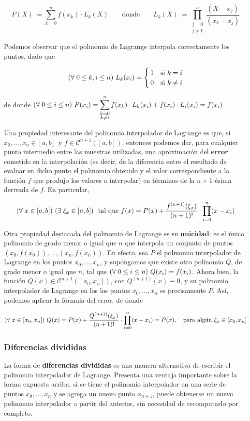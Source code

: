\[ P(X) := \sum_{k=0}^n f(x_k) \cdot L_{k}(X)
    \qquad \text{donde} \qquad
    L_{k}(X) := \prod_{\substack{j=0 \\ j \neq k}}^n
    \frac{(X-x_j)}{(x_k-x_j)} \]

Podemos observar que el polinomio de Lagrange interpola correctamente los
puntos, dado que

\[ \left(\forall\;0 \leq k,i \leq n\right)\, L_k(x_i) = \begin{cases}
    1 & \text{si } k = i \\
    0 & \text{si } k \neq i
    \end{cases} \]

de donde $\displaystyle \left(\forall\;0 \leq i \leq n\right)\, P(x_i) =
    \sum_{\substack{k=0 \\ k \neq i}}^n f(x_k) \cdot L_{k}(x_i) +
    f(x_i) \cdot L_i(x_i) = f(x_i)$.

Una propiedad interesante del polinomio interpolador de Lagrange es que, si
$x_0, \dots, x_n \in [a,b]$ y $f \in \mathcal{C}^{n+1}([a,b])$, entonces
podemos dar, para cualquier punto intermedio entre las muestras utilizadas,
una aproximación del \textbf{error} cometido en la interpolación (es decir, de
la diferencia entre el resultado de evaluar en dicho punto el polinomio
obtenido y el valor correspondiente a la función $f$ que produjo los valores
a interpolar) en términos de la $n+1$-ésima derivada de $f$. En particular,

\[ \left(\forall\;x \in [a,b]\right)\, \left(\exists\;\xi_x \in [a,b]\right)\, \text{ tal que }
    f(x) = P(x) + \frac{f^{(n+1)}(\xi_x)}{(n+1)!} \cdot \prod_{i=0}^{n}(x-x_i) \]

Otra propiedad destacada del polinomio de Lagrange es su \textbf{unicidad}: es
el único polinomio de grado menor o igual que $n$ que interpola un
conjunto de puntos $(x_0, f(x_0)), \dots, (x_n, f(x_n))$. En efecto, sea $P$ el
polinomio interpolador de Lagrange en los puntos $x_0, \dots, x_n$, y
supongamos que existe otro polinomio $Q$, de grado menor o igual que $n$, tal
que $\left(\forall\;0 \leq i \leq n\right)\, Q(x_i) = f(x_i)$. Ahora bien, la función $Q(x) \in
\mathcal{C}^{n+1}([x_0,x_n])$, con $Q^{(n+1)}(x) \equiv 0$, y su polinomio
interpolador de Lagrange en los los puntos $x_0, \dots, x_n$ es precisamente
$P$. Así, podemos aplicar la fórmula del error, de donde

\[ \left(\forall\;x \in [x_0,x_n]\right)\,
    Q(x) = P(x) + \frac{Q^{(n+1)}(\xi_x)}{(n+1)!} \cdot \prod_{i=0}^{n}(x-x_i)
    = P(x),\quad \text{para algún } \xi_x \in [x_0,x_n] \]

\subsubsection{Diferencias divididas}
La forma de \textbf{diferencias divididas} es una manera alternativa de
escribir el polinomio interpolador de Lagrange. Presenta una ventaja importante
sobre la forma expuesta arriba; si se tiene el polinomio interpolador en
una serie de puntos $x_0, \dots, x_n$ y se agrega un nuevo punto $x_{n+1}$,
puede obtenerse un nuevo polinomio interpolador a partir del anterior, sin
necesidad de recomputarlo por completo.

